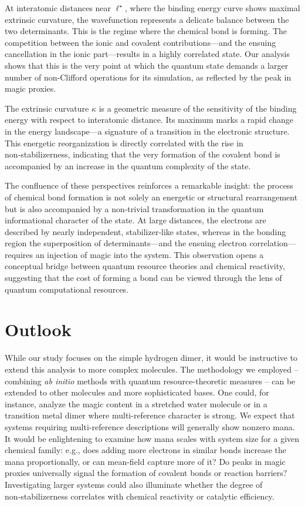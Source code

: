 \documentclass[aps,prl,twocolumn,groupedaddress, reprint,floatfix,nofootinbib,longbibliography]{revtex4-2}
\begin{document}
        At interatomic distances near $\ell^\star$, where the binding energy curve shows maximal extrinsic curvature, the wavefunction represents a delicate balance between the two determinants. This is the regime where the chemical bond is forming. The competition between the ionic and covalent contributions—and the ensuing cancellation in the ionic part—results in a highly correlated state. Our analysis shows that this is the very point at which the quantum state demands a larger number of non‑Clifford operations for its simulation, as reflected by the peak in magic proxies.

        The extrinsic curvature $\kappa$ is a geometric measure of the sensitivity of the binding energy with respect to interatomic distance. Its maximum marks a rapid change in the energy landscape—a signature of a transition in the electronic structure. This energetic reorganization is directly correlated with the rise in non‑stabilizerness, indicating that the very formation of the covalent bond is accompanied by an increase in the quantum complexity of the state.

        The confluence of these perspectives reinforces a remarkable insight: the process of chemical bond formation is not solely an energetic or structural rearrangement but is also accompanied by a non‑trivial transformation in the quantum informational character of the state. At large distances, the electrons are described by nearly independent, stabilizer‑like states, whereas in the bonding region the superposition of determinants—and the ensuing electron correlation—requires an injection of magic into the system. This observation opens a conceptual bridge between quantum resource theories and chemical reactivity, suggesting that the cost of forming a bond can be viewed through the lens of quantum computational resources.

\section{Outlook}

    While our study focuses on the simple hydrogen dimer, it would be instructive to extend this analysis to more complex molecules. The methodology we employed – combining \textit{ab initio} methods with quantum resource-theoretic measures – can be extended to other molecules and more sophisticated bases. One could, for instance, analyze the magic content in a stretched water molecule or in a transition metal dimer where multi-reference character is strong. We expect that systems requiring multi-reference descriptions will generally show nonzero mana. It would be enlightening to examine how mana scales with system size for a given chemical family: e.g., does adding more electrons in similar bonds increase the mana proportionally, or can mean-field capture more of it? Do peaks in magic proxies universally signal the formation of covalent bonds or reaction barriers? Investigating larger systems could also illuminate whether the degree of non‑stabilizerness correlates with chemical reactivity or catalytic efficiency.
\end{document}
